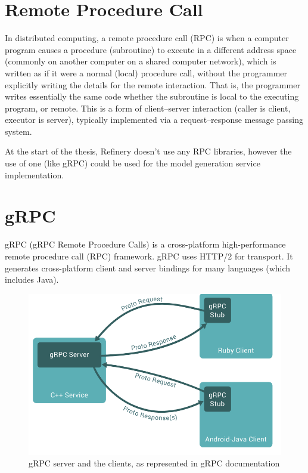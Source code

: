 \section{Remote Procedure Call}
	In distributed computing, a remote procedure call (RPC) \cite{rpc} is when a computer program causes a procedure (subroutine) to execute in a different address space 
	(commonly on another computer on a shared computer network), which is written as if it were a normal (local) procedure call, without the programmer 
	explicitly writing the details for the remote interaction. That is, the programmer writes essentially the same code whether the subroutine is local to 
	the executing program, or remote.
	This is a form of client–server interaction (caller is client, executor is server), typically implemented via a request–response message passing system.

	At the start of the thesis, Refinery doesn't use any RPC libraries, however the use of one (like gRPC) could be used for the model generation service implementation.

\section{gRPC}
	gRPC (gRPC Remote Procedure Calls) \cite{grpcwiki} is a cross-platform high-performance remote procedure call (RPC) framework. 
	gRPC uses HTTP/2 for transport.	It generates cross-platform client and server bindings for many languages (which includes Java). 

	\begin{figure}[h!]
		\begin{center}
			\includegraphics[scale=0.8]{include/imgs/grpc_works.PNG}	
		\end{center}
		\caption{gRPC server and the clients, as represented in gRPC documentation \cite{grpcspec}}
	\end{figure}

